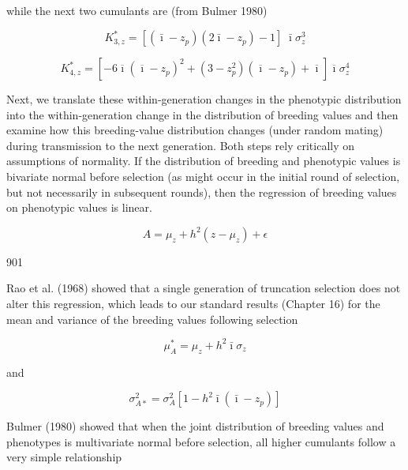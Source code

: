 \documentclass{article}
\begin{document}
while the next two cumulants are (from Bulmer 1980)

\begin{equation}
K_{3,z}^{*}=[(\bar{\imath}-z_{p})(2\bar{\imath}-z_{p})-1]\;\bar{\imath}\sigma_{z}^{3}
\tag{24.22a}
\label{eq:24_22a}
\end{equation}

\begin{equation}
K_{4,z}^{*}=\left[-6\overline{\imath}\left(\overline{\imath}-z_{p}\right)^{2}+(3-z_{p}^{2})\left(\overline{\imath}-z_{p}\right)+\overline{\imath}\right]\overline{\imath}\sigma_{z}^{4}
\tag{24.22b}
\label{eq:24_22b}
\end{equation}

Next, we translate these within-generation changes in the phenotypic distribution into the within-generation change in the distribution of breeding values and then examine how this breeding-value distribution changes (under random mating) during transmission to the next generation. Both steps rely critically on assumptions of normality. If the distribution of breeding and phenotypic values is bivariate normal before selection (as might occur in the initial round of selection, but not necessarily in subsequent rounds), then the regression of breeding values on phenotypic values is linear.

\begin{equation}
A=\mu_{z}+h^{2}(z-\mu_{z})+\epsilon
\end{equation}

901

Rao et al. (1968) showed that a single generation of truncation selection does not alter this regression, which leads to our standard results (Chapter 16) for the mean and variance of the breeding values following selection

\begin{equation}
\mu_{A}^{*}=\mu_{z}+h^{2}\bar{\imath}\sigma_{z}
\tag{24.23a}
\label{eq:24_23a}
\end{equation}

and

\begin{equation}
\sigma_{A*}^{2}=\sigma_{A}^{2}\left[1-h^{2}\bar{\imath}\left(\bar{\imath}-z_{p}\right)\right]
\tag{24.23b}
\label{eq:24_23b}
\end{equation}

Bulmer (1980) showed that when the joint distribution of breeding values and phenotypes is multivariate normal before selection, all higher cumulants follow a very simple relationship
\end{document}
